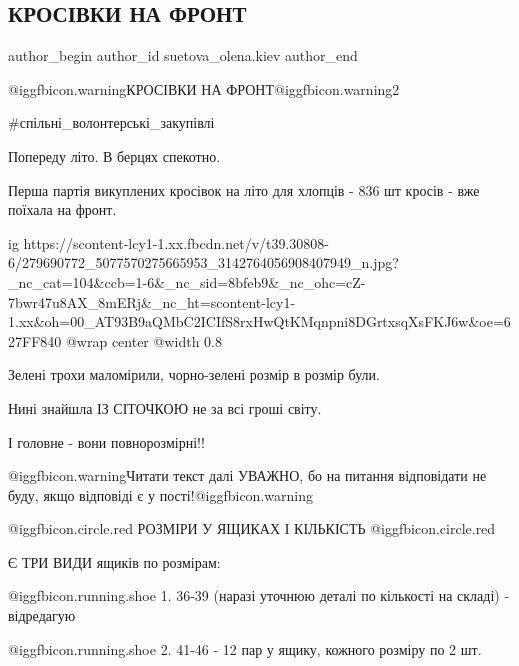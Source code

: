  
 
 
 
 
 
\subsection{КРОСІВКИ НА ФРОНТ}
\label{sec:09_05_2022.fb.suetova_olena.kiev.1.krosivky_na_front}
 
\ifcmt
 author_begin
   author_id suetova_olena.kiev
 author_end
\fi

@igg{fbicon.warning}КРОСІВКИ НА ФРОНТ@igg{fbicon.warning}2

\#спільні\_волонтерські\_закупівлі

Попереду літо. В берцях спекотно.

Перша партія викуплених кросівок на літо для хлопців -  836 шт кросів -  вже
поїхала на фронт.

\ifcmt
  ig https://scontent-lcy1-1.xx.fbcdn.net/v/t39.30808-6/279690772_5077570275665953_3142764056908407949_n.jpg?_nc_cat=104&ccb=1-6&_nc_sid=8bfeb9&_nc_ohc=cZ-7bwr47u8AX_8mERj&_nc_ht=scontent-lcy1-1.xx&oh=00_AT93B9aQMbC2ICIfS8rxHwQtKMqnpni8DGrtxsqXsFKJ6w&oe=627FF840
  @wrap center
  @width 0.8
\fi

Зелені трохи маломірили, чорно-зелені розмір в розмір були.

Нині знайшла ІЗ СІТОЧКОЮ не за всі гроші світу.

І головне - вони повнорозмірні!!

@igg{fbicon.warning}Читати текст далі УВАЖНО, бо на питання відповідати не
буду, якщо відповіді є у пості!@igg{fbicon.warning}

 @igg{fbicon.circle.red} РОЗМІРИ У ЯЩИКАХ І КІЛЬКІСТЬ @igg{fbicon.circle.red} 

Є ТРИ ВИДИ ящиків по розмірам:

@igg{fbicon.running.shoe}  1. 36-39 (наразі уточнюю деталі по кількості на складі) - відредагую

@igg{fbicon.running.shoe}  2. 41-46 - 12 пар у ящику, кожного розміру по 2 шт.

